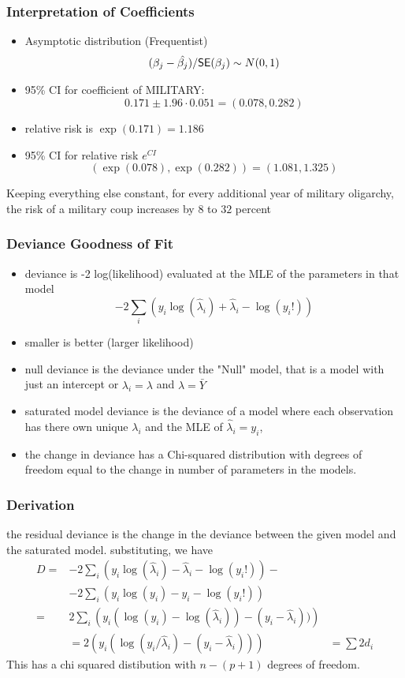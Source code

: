 \documentclass[handout]{beamer}\usepackage[]{graphicx}\usepackage[]{color}
\begin{document}
\begin{frame}[fragile]\frametitle{Interpretation of Coefficients}

  \begin{itemize}
  \item Asymptotic distribution (Frequentist)
$$(\beta_j - \hat{\beta_j})/\textsf{SE}(\beta_j) \sim N(0,1)$$  \pause
  \item 95\% CI for coefficient of MILITARY:
   $$0.171 \pm 1.96 \cdot 0.051  = (
   0.078, 0.282)$$  \pause
  \item relative risk is $\exp(0.171) = 1.186$  \pause
  \item  95\% CI for relative risk  $e^{CI}$
$$ (\exp(0.078), \exp(0.282))  =
(1.081, 1.325)$$
  \end{itemize}

Keeping everything else constant, for every additional year of military oligarchy, the risk of a
military coup increases by $8$ to $32$ percent

\end{frame}

\begin{frame}\frametitle{Deviance Goodness of Fit}
\begin{itemize}
\item deviance is -2 log(likelihood) evaluated at the MLE of the parameters in that model
$$ -2 \sum_i (y_i \log(\hat{\lambda}_i)  + \hat{\lambda}_i -
\log( y_i!))$$
\item smaller is better (larger likelihood)
\item null deviance is the deviance under the "Null" model, that is a model with just an intercept or $\lambda_i = \lambda$ and $\hat{\lambda} = \bar{Y}$
\item saturated model deviance is the deviance of a model where each observation has there own unique $\lambda_i$ and the MLE of $\hat{\lambda}_i = y_i$,
\item the change in deviance has a Chi-squared distribution
with degrees of freedom equal to the change in number of parameters in the models.
\end{itemize}
\end{frame}


\begin{frame} \frametitle{Derivation}
the residual deviance is the change in the deviance between the given model and the saturated model. substituting, we have
\begin{align*}
D  = & -2\sum_i\left(y_i \log(\hat{\lambda}_i)  - \hat{\lambda}_i -
\log(y_i!)\right) - \\
&  -2\sum_i\left (y_i \log(y_i)  - y_i -
\log(y_i!)\right) \\
=  & 2 \sum_i\left(y_i (\log(y_i) -  \log(\hat{\lambda}_i))   -( y_i -  \hat{\lambda}_i)) \right) \\
& = 2 \left(y_i (\log(y_i/\hat{\lambda}_i)   - (y_i -  \hat{\lambda}_i)) \right)
& = \sum 2 d_i
\end{align*}
This has a chi squared distibution with $n - (p+1)$ degrees of freedom.
\end{frame}
\end{document}
